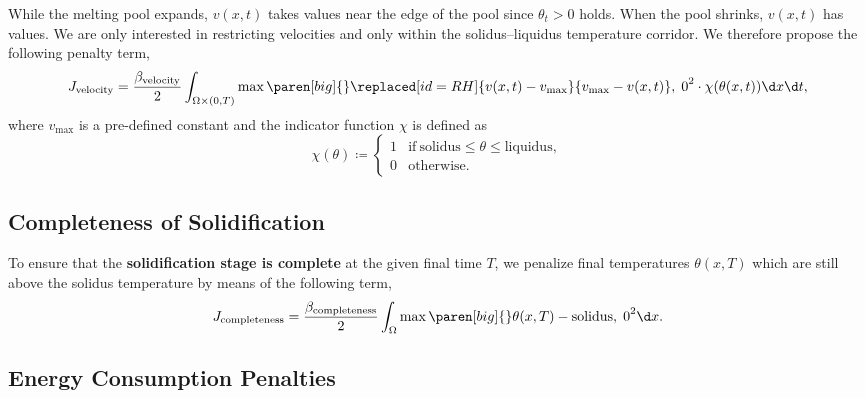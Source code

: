 While the melting pool expands, $v(x,t)$ takes  values near the edge of the pool since $\theta_t > 0$ holds.
When the pool shrinks, $v(x,t)$ has  values.
We are only interested in restricting  velocities and only within the solidus--liquidus temperature corridor.
We therefore propose the following penalty term,
\begin{equation} \label{eq:J_velocity}
	J_\textup{velocity} 
	= 
	\frac{\beta_\textup{velocity}}{2} \int_{\Omega \times (0,T)} \max \paren[big]\{\}{\replaced[id=RH]{v(x,t) - v_{\max}}{v_{\max} - v(x,t)}, \; 0}^2 \cdot \chi(\theta(x,t)) \d x \d t
	,
\end{equation}
where $v_{\max}$ is a pre-defined constant and the indicator function $\chi$ is defined as
\begin{equation}
	\chi(\theta) 
	\coloneqq 
	\begin{cases}
		1 & \text{if}\ \text{solidus} \le \theta \le \text{liquidus}
		, 
		\\
		0 & \text{otherwise}
		.
	\end{cases}
\end{equation}


\subsection{Completeness of Solidification}

To ensure that the \textbf{solidification stage is complete} at the given final time $T$, we penalize final temperatures $\theta(x,T)$ which are still above the solidus temperature by means of the following term,
\begin{equation} \label{eq:J_completeness}
	J_\textup{completeness} 
	=
	\frac{\beta_\textup{completeness}}{2} \int_{\Omega} \max \paren[big]\{\}{\theta(x, T) - \text{solidus}, \; 0}^2 \d x
	.
\end{equation}


\subsection{Energy Consumption Penalties}

